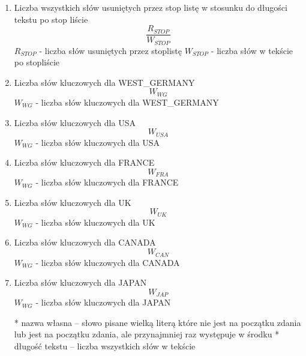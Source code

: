 \documentclass{classrep}
\begin{document}
\begin{enumerate}
  \item Liczba wszystkich słów usuniętych przez stop listę w stosunku do długości tekstu po stop liście
  \newline
  \begin{equation}
  	\frac{R_{STOP}}{W_{STOP}}
  \end{equation}
  \newline \quad $R_{STOP}$ - liczba słów usuniętych przez stoplistę 
  \newline \quad $W_{STOP}$ - liczba słów w tekście po stopliście
  
  \item Liczba słów kluczowych dla WEST\_GERMANY
  \newline
  \begin{equation}
  	W_{WG}
  \end{equation}
  \newline \quad $W_{WG}$ - liczba słów kluczowych dla WEST\_GERMANY
  
  \item Liczba słów kluczowych dla USA
  \newline
  \begin{equation}
  	W_{USA}
  \end{equation}
  \newline \quad $W_{WG}$ - liczba słów kluczowych dla USA
  
  
  \item Liczba słów kluczowych dla FRANCE
  \newline
  \begin{equation}
  	W_{FRA}
  \end{equation}
  \newline \quad $W_{WG}$ - liczba słów kluczowych dla FRANCE
  
  
  \item Liczba słów kluczowych dla UK
  \newline
  \begin{equation}
  	W_{UK}
  \end{equation}
  \newline \quad $W_{WG}$ - liczba słów kluczowych dla UK
  
  
  \item Liczba słów kluczowych dla CANADA
  \newline
  \begin{equation}
  	W_{CAN}
  \end{equation}
  \newline \quad $W_{WG}$ - liczba słów kluczowych dla CANADA
  
  
  \item Liczba słów kluczowych dla JAPAN
  \newline
  \begin{equation}
  	W_{JAP}
  \end{equation}
  \newline \quad $W_{WG}$ - liczba słów kluczowych dla JAPAN

  * nazwa własna – słowo pisane wielką literą które nie jest na początku zdania lub jest na początku zdania, ale przynajmniej raz występuje w środku\newline
* długość tekstu – liczba wszystkich słów w tekście
\end{enumerate}
\end{document}
